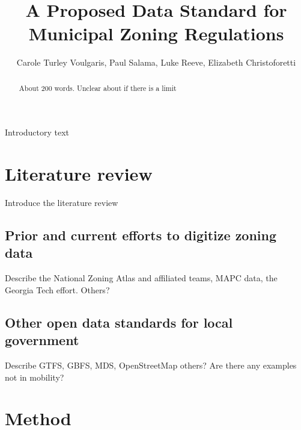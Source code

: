 \documentclass[,]{sagej}
\begin{document}

\title{A Proposed Data Standard for Municipal Zoning Regulations}

\runninghead{}

\author{Carole Turley Voulgaris\affilnum{}, Paul Salama\affilnum{}, Luke Reeve\affilnum{}, Elizabeth Christoforetti\affilnum{}}

\affiliation{\affilnum{}{}\\\affilnum{}{}}



\begin{abstract}
About 200 words. Unclear about if there is a limit
\end{abstract}


\maketitle

Introductory text

\hypertarget{literature-review}{%
\section{Literature review}\label{literature-review}}

Introduce the literature review

\hypertarget{prior-and-current-efforts-to-digitize-zoning-data}{%
\subsection{Prior and current efforts to digitize zoning data}\label{prior-and-current-efforts-to-digitize-zoning-data}}

Describe the National Zoning Atlas and affiliated teams, MAPC data, the Georgia Tech
effort. Others?

\hypertarget{other-open-data-standards-for-local-government}{%
\subsection{Other open data standards for local government}\label{other-open-data-standards-for-local-government}}

Describe GTFS, GBFS, MDS, OpenStreetMap others? Are there any examples not in mobility?

\hypertarget{method}{%
\section{Method}\label{method}}
\end{document}
